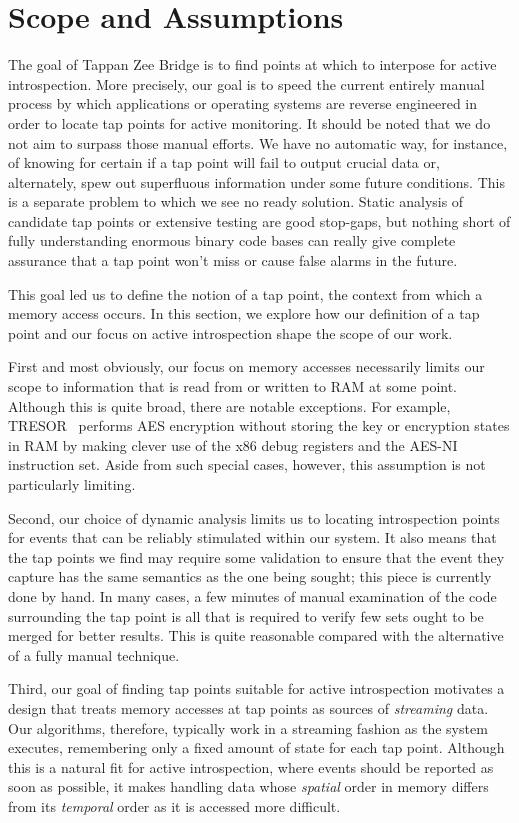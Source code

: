 \section{Scope and Assumptions}
\label{sec:scope}

The goal of Tappan Zee Bridge is to find points at which to interpose
for active introspection. More precisely, our goal is to speed the 
current entirely manual process by which applications or operating
systems are reverse engineered in order to locate tap points for
active monitoring. It should be noted that we do not aim to surpass 
those manual efforts. We have no automatic way, for instance, of 
knowing for certain if a tap point will fail to output crucial data 
or, alternately, spew out superfluous information under some future 
conditions. This is a separate problem to which we see no ready 
solution. Static analysis of candidate tap points or extensive
testing are good stop-gaps, but nothing short of fully understanding
enormous binary code bases can really give complete assurance that 
a tap point won't miss or cause false alarms in the future. 

This goal led us to define the notion of a tap point, the context from
which a memory access occurs. In this section, we explore how our
definition of a tap point and our focus on active introspection shape
the scope of our work.

First and most obviously, our focus on memory accesses necessarily
limits our scope to information that is read from or written to RAM at
some point. Although this is quite broad, there are notable exceptions.
For example, TRESOR~\cite{Muller:2011} performs AES encryption without
storing the key or encryption states in RAM by making clever use of the
x86 debug registers and the AES-NI instruction set. Aside from such
special cases, however, this assumption is not particularly limiting.

Second, our choice of dynamic analysis limits us to locating
introspection points for events that can be reliably stimulated within
our system. It also means that the tap points we find may require some
validation to ensure that the event they capture has the same semantics
as the one being sought; this piece is currently done by hand.
In many cases, a few minutes of manual examination of the code
surrounding the tap point is all that is required to verify few sets
ought to be merged for better results. This is quite reasonable
compared with the alternative of a fully manual technique.

Third, our goal of finding tap points suitable for active introspection
motivates a design that treats memory accesses at tap points as sources
of \emph{streaming} data. Our algorithms, therefore, typically work in a
streaming fashion as the system executes, remembering only a fixed
amount of state for each tap point. Although this is a natural fit for
active introspection, where events should be reported as soon as
possible, it makes handling data whose \emph{spatial} order in memory
differs from its \emph{temporal} order as it is accessed more difficult.

